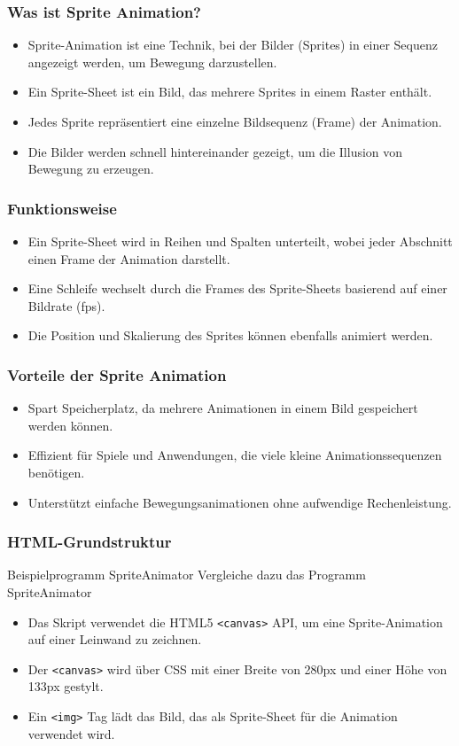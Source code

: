 \documentclass{beamer}
\begin{document}
\begin{frame}
    \frametitle{Was ist Sprite Animation?}
    \begin{itemize}
        \item Sprite-Animation ist eine Technik, bei der Bilder (Sprites) in einer Sequenz angezeigt werden, um Bewegung darzustellen.
        \item Ein Sprite-Sheet ist ein Bild, das mehrere Sprites in einem Raster enthält.
        \item Jedes Sprite repräsentiert eine einzelne Bildsequenz (Frame) der Animation.
        \item Die Bilder werden schnell hintereinander gezeigt, um die Illusion von Bewegung zu erzeugen.
    \end{itemize}
\end{frame}

\begin{frame}
    \frametitle{Funktionsweise}
    \begin{itemize}
        \item Ein Sprite-Sheet wird in Reihen und Spalten unterteilt, wobei jeder Abschnitt einen Frame der Animation darstellt.
        \item Eine Schleife wechselt durch die Frames des Sprite-Sheets basierend auf einer Bildrate (fps).
        \item Die Position und Skalierung des Sprites können ebenfalls animiert werden.
    \end{itemize}
\end{frame}

\begin{frame}
    \frametitle{Vorteile der Sprite Animation}
    \begin{itemize}
        \item Spart Speicherplatz, da mehrere Animationen in einem Bild gespeichert werden können.
        \item Effizient für Spiele und Anwendungen, die viele kleine Animationssequenzen benötigen.
        \item Unterstützt einfache Bewegungsanimationen ohne aufwendige Rechenleistung.
    \end{itemize}
\end{frame}


\begin{frame}
    \frametitle{HTML-Grundstruktur}
    \begin{block}{Beispielprogramm SpriteAnimator}
        Vergleiche dazu das Programm  SpriteAnimator
    \end{block}
    \begin{itemize}
        \item Das Skript verwendet die HTML5 \texttt{<canvas>} API, um eine Sprite-Animation auf einer Leinwand zu zeichnen.
        \item Der \texttt{<canvas>} wird über CSS mit einer Breite von 280px und einer Höhe von 133px gestylt.
        \item Ein \texttt{<img>} Tag lädt das Bild, das als Sprite-Sheet für die Animation verwendet wird.
    \end{itemize}
\end{frame}
\end{document}

